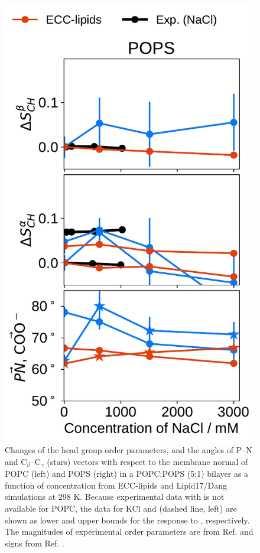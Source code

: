 \documentclass[journal=jpcbfk,manuscript=article]{achemso}
\newlength{\figheight}
\begin{document}
\begin{figure}[tbp!]
  \includegraphics[height=\figheight]{../img/ecc_pops/order_parameters_changes_ecc-lip_L14_A-B-PN-COO_POPS_nacl.pdf} 
  \caption{\label{fig:delta_ordPar_NaCl_PCPS} 
    Changes of the head group order parameters, and the angles of P--N and C$_\beta$--C$_\gamma$ (stars) vectors
    with respect to the membrane normal of POPC (left) and POPS (right) in a POPC:POPS (5:1) bilayer 
    as a function of  concentration from ECC-lipids and Lipid17/Dang simulations at 298 K.
    Because experimental data with  is not available for POPC, the data for KCl and  (dashed line, left)
    are shown as lower and upper bounds for the response to , respectively.
    The magnitudes of experimental order parameters are from Ref.  and signs from Ref. .
  }
  \end{figure} 
\end{document}
